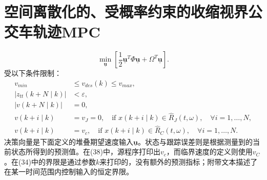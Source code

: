 \documentclass{article}
\newcommand{\uv}{\underline{\mathbf{u}}}
\begin{document}
\section*{空间离散化的、受概率约束的收缩视界公交车轨迹MPC}
\begin{equation}
\min_{\uv}\left[\frac12\uv^T\Phi\uv+\Omega^T\uv\right].
\tag{33}
\end{equation}
受以下条件限制：
\begin{align}
v_{min}&\leq v_{des}(k)\leq v_{max}, \tag{34}\\
\left|z_{tt}(k+N\mid k)\right|&<\varepsilon, \tag{35}\\
\left|v(k+N\mid k)\right|&=0, \tag{36}\\
v(k+i\mid k)&=v_J=0,
\quad\text{if }x(k+i\mid k)\in\hat R_J(t,\omega),
\quad\forall i=1,\ldots,N, \tag{37}\\
v(k+i\mid k)&=v_c,
\quad\text{if }x(k+i\mid k)\in\hat R_C(t,\omega),
\quad\forall i=1,\ldots,N. \tag{38}
\end{align}
决策向量是下面定义的堆叠期望速度输入\(\uv\)。状态与跟踪误差则是根据测量到的当前状态所得到的预测值。在(38)中，源程序打印出\(v_c\)，而临界速度的定义则使用\(v_C\)。在(34)中的界限是通过参数\(k\)来打印的，没有额外的预测指标；附带文本描述了在某一时间范围内控制输入的恒定界限。
\end{document}
